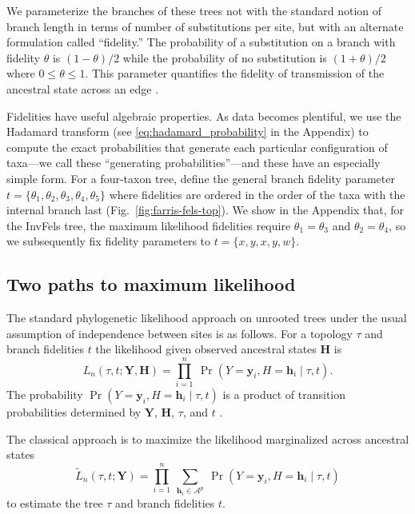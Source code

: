 \documentclass[11pt]{article}
\newcommand{\alphabet}{\mathcal{A}}
\newcommand{\fullAlignment}{\mathbf{Y}}
\newcommand{\alignmentColumn}{\mathbf{y}}
\newcommand{\alignmentColumnRV}{Y}
\newcommand{\fullAncestralStates}{\mathbf{H}}
\newcommand{\ancestralStateColumn}{\mathbf{h}}
\newcommand{\ancestralStateColumnRV}{H}
\newcommand{\nCols}{n}
\newcommand{\nAncestralStateRows}{p}
\begin{document}
We parameterize the branches of these trees not with the standard notion of branch length in terms of number of substitutions per site, but with an alternate formulation called ``fidelity.''
The probability of a substitution on a branch with fidelity $\theta$ is $(1-\theta)/2$ while the probability of no substitution is $(1+\theta)/2$ where $0 \le \theta \le 1$.
This parameter quantifies the fidelity of transmission of the ancestral state across an edge \citep{Matsen2007-jq}.

Fidelities have useful algebraic properties.
As data becomes plentiful, we use the Hadamard transform (see \eqref{eq:hadamard_probability} in the Appendix) to compute the exact probabilities that generate each particular configuration of taxa---we call these ``generating probabilities''---and these have an especially simple form.
For a four-taxon tree, define the general branch fidelity parameter $t=\{\theta_1,\theta_2,\theta_3,\theta_4,\theta_5\}$ where fidelities are ordered in the order of the taxa with the internal branch last (Fig.~\ref{fig:farris-fels-top}).
We show in the Appendix that, for the InvFels tree, the maximum likelihood fidelities require $\theta_1=\theta_3$ and $\theta_2=\theta_4$, so we subsequently fix fidelity parameters to $t=\{x,y,x,y,w\}$.

\subsection*{Two paths to maximum likelihood}

The standard phylogenetic likelihood approach on unrooted trees under the usual assumption of independence between sites is as follows.
For a topology $\tau$ and branch fidelities $t$ the likelihood given observed ancestral states $\fullAncestralStates$ is
\begin{equation}
\label{eq:full_likelihood}
L_\nCols(\tau, t; \fullAlignment,\fullAncestralStates) = \prod_{i=1}^{\nCols} \ \Pr(\alignmentColumnRV=\alignmentColumn_i, \ancestralStateColumnRV=\ancestralStateColumn_i \mid \tau, t).
\end{equation}
The probability $\Pr(\alignmentColumnRV=\alignmentColumn_i, \ancestralStateColumnRV=\ancestralStateColumn_i \mid \tau, t)$ is a product of transition probabilities determined by $\fullAlignment$, $\fullAncestralStates$, $\tau$, and $t$ \citep{Felsenstein2004}.

The classical approach is to maximize the likelihood marginalized across ancestral states
\begin{equation}
\label{eq:marginal_likelihood}
\tilde{L}_\nCols(\tau, t; \fullAlignment) = \prod_{i=1}^{\nCols} \ \sum_{\ancestralStateColumn_i\in\alphabet^{\nAncestralStateRows}} \ \Pr(\alignmentColumnRV=\alignmentColumn_i, \ancestralStateColumnRV=\ancestralStateColumn_i \mid \tau, t)
\end{equation}
to estimate the tree $\tau$ and branch fidelities $t$.
\end{document}
